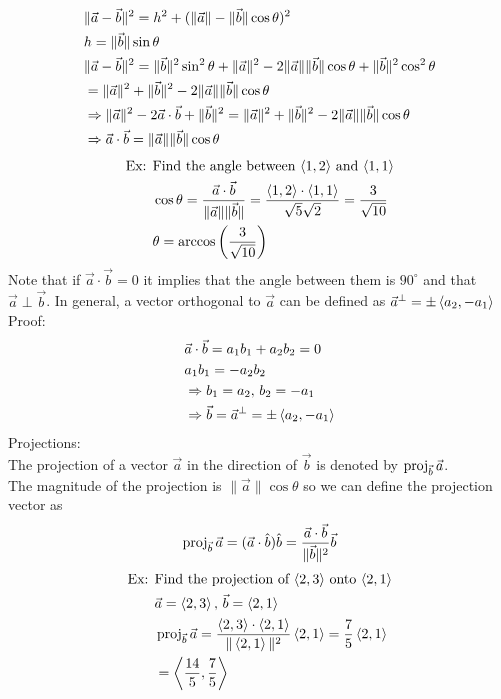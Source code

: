 \documentclass[11pt, fleqn]{article}
\begin{document}
\begin{align*}
    &\|\vec{a}-\vec{b}\|^2=h^2+(\|\vec{a}\|-\|\vec{b}\|\cos\theta)^2\\
    &h=\|\vec{b}\|\sin\theta\\
    &\|\vec{a}-\vec{b}\|^2=\|\vec{b}\|^2\sin^2\theta+\|\vec{a}\|^2-2\|\vec{a}\|\|\vec{b}\|\cos\theta+\|\vec{b}\|^2\cos^2\theta\\
    &=\|\vec{a}\|^2+\|\vec{b}\|^2-2\|\vec{a}\|\|\vec{b}\|\cos\theta\\
    &\Rightarrow\|\vec{a}\|^2-2\vec{a}\cdot\vec{b}+\|\vec{b}\|^2=\|\vec{a}\|^2+\|\vec{b}\|^2-2\|\vec{a}\|\|\vec{b}\|\cos\theta\\
    &\Rightarrow\vec{a}\cdot\vec{b}=\|\vec{a}\|\|\vec{b}\|\cos\theta
\end{align*}
\begin{align*}
    \text{Ex: }&\text{Find the angle between $\left\langle 1,2 \right\rangle$ and $\left\langle 1,1 \right\rangle$}\\
    &\cos\theta=\frac{\vec{a}\cdot\vec{b}}{\|\vec{a}\|\|\vec{b}\|}=\frac{\left\langle 1,2 \right\rangle\cdot\left\langle 1,1 \right\rangle}{\sqrt{5}\sqrt{2}}=\frac{3}{\sqrt{10}}\\
    &\theta=\arccos\left( \frac{3}{\sqrt{10}} \right)
\end{align*}
Note that if $\vec{a}\cdot\vec{b}=0$ it implies that the angle between them is $90^\circ$ and that $\vec{a}\perp\vec{b}$. In general, a vector orthogonal to $\vec{a}$ can be defined as $\vec{a}^\perp=\pm\left\langle a_2,-a_1 \right\rangle$\\
Proof:
\begin{align*}
    &\vec{a}\cdot\vec{b}=a_1b_1+a_2b_2=0\\
    &a_1b_1=-a_2b_2\\
    &\Rightarrow b_1=a_2,\,b_2=-a_1\\
    &\Rightarrow\vec{b}=\vec{a}^\perp=\pm\left\langle a_2,-a_1 \right\rangle
\end{align*}
Projections:\\
The projection of a vector $\vec{a}$ in the direction of $\vec{b}$ is denoted by $\operatorname{proj}_{\vec{b}}\vec{a}$.\\
The magnitude of the projection is $\|\vec{a}\|\cos\theta$ so we can define the projection vector as
$$\operatorname{proj}_{\vec{b}}\vec{a}=(\vec{a}\cdot\hat{b})\hat{b}=\frac{\vec{a}\cdot\vec{b}}{\|\vec{b}\|^2}\vec{b}$$
\begin{align*}
    \text{Ex: }&\text{Find the projection of $\left\langle 2,3 \right\rangle$ onto $\left\langle 2,1 \right\rangle$}\\
    &\vec{a}=\left\langle 2,3 \right\rangle,\,\vec{b}=\left\langle 2,1 \right\rangle\\
    &\operatorname{proj}_{\vec{b}}\vec{a}=\frac{\left\langle 2,3 \right\rangle\cdot\left\langle 2,1 \right\rangle}{\|\left\langle 2,1 \right\rangle\|^2}\left\langle 2,1 \right\rangle=\frac{7}{5}\left\langle 2,1 \right\rangle\\
    &=\left\langle \frac{14}{5},\frac{7}{5} \right\rangle
\end{align*}
\end{document}
